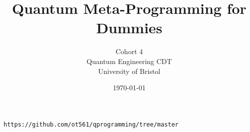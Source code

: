 \documentclass[12pt]{book}
\begin{document}
\title{Quantum Meta-Programming for Dummies}
    \author{Cohort 4 \\[0.5em] Quantum Engineering CDT \\ University of Bristol}
    \date{\today}
    \maketitle



\tableofcontents
\newpage






\newpage


\newpage









\begin{verbatim}
https://github.com/ot561/qprogramming/tree/master
\end{verbatim}




\end{document}
